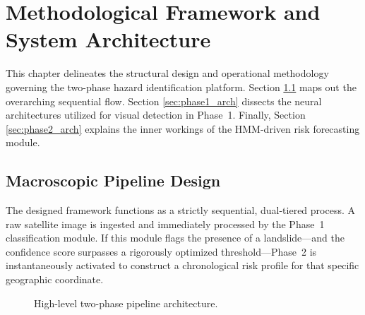 \documentclass[12pt,a4paper]{report}
\begin{document}
\chapter{Methodological Framework and System Architecture}\label{methodology}

This chapter delineates the structural design and operational methodology governing the two-phase hazard identification platform. Section \ref{sec:pipeline} maps out the overarching sequential flow. Section \ref{sec:phase1_arch} dissects the neural architectures utilized for visual detection in Phase~1. Finally, Section \ref{sec:phase2_arch} explains the inner workings of the HMM-driven risk forecasting module.

\section{Macroscopic Pipeline Design}\label{sec:pipeline}

The designed framework functions as a strictly sequential, dual-tiered process. A raw satellite image is ingested and immediately processed by the Phase~1 classification module. If this module flags the presence of a landslide—and the confidence score surpasses a rigorously optimized threshold—Phase~2 is instantaneously activated to construct a chronological risk profile for that specific geographic coordinate.

\begin{figure}[H]
\centering
{}
\caption{High-level two-phase pipeline architecture.}
\label{fig:pipeline}
\end{figure}
\end{document}
